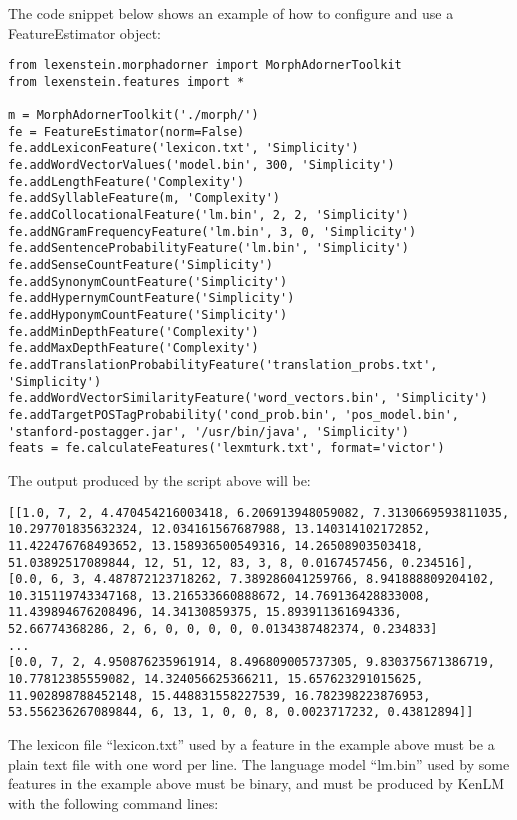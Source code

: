 The code snippet below shows an example of how to configure and use a FeatureEstimator object:

\begin{lstlisting}
from lexenstein.morphadorner import MorphAdornerToolkit
from lexenstein.features import *

m = MorphAdornerToolkit('./morph/')
fe = FeatureEstimator(norm=False)
fe.addLexiconFeature('lexicon.txt', 'Simplicity')
fe.addWordVectorValues('model.bin', 300, 'Simplicity')
fe.addLengthFeature('Complexity')
fe.addSyllableFeature(m, 'Complexity')
fe.addCollocationalFeature('lm.bin', 2, 2, 'Simplicity')
fe.addNGramFrequencyFeature('lm.bin', 3, 0, 'Simplicity')
fe.addSentenceProbabilityFeature('lm.bin', 'Simplicity')
fe.addSenseCountFeature('Simplicity')
fe.addSynonymCountFeature('Simplicity')
fe.addHypernymCountFeature('Simplicity')
fe.addHyponymCountFeature('Simplicity')
fe.addMinDepthFeature('Complexity')
fe.addMaxDepthFeature('Complexity')
fe.addTranslationProbabilityFeature('translation_probs.txt', 'Simplicity')
fe.addWordVectorSimilarityFeature('word_vectors.bin', 'Simplicity')
fe.addTargetPOSTagProbability('cond_prob.bin', 'pos_model.bin', 'stanford-postagger.jar', '/usr/bin/java', 'Simplicity')
feats = fe.calculateFeatures('lexmturk.txt', format='victor')
\end{lstlisting}

The output produced by the script above will be:

\begin{lstlisting}
[[1.0, 7, 2, 4.470454216003418, 6.206913948059082, 7.3130669593811035, 10.297701835632324, 12.034161567687988, 13.140314102172852, 11.422476768493652, 13.158936500549316, 14.26508903503418, 51.03892517089844, 12, 51, 12, 83, 3, 8, 0.0167457456, 0.234516], [0.0, 6, 3, 4.487872123718262, 7.389286041259766, 8.941888809204102, 10.315119743347168, 13.216533660888672, 14.769136428833008, 11.439894676208496, 14.34130859375, 15.893911361694336, 52.66774368286, 2, 6, 0, 0, 0, 0, 0.0134387482374, 0.234833]
...
[0.0, 7, 2, 4.950876235961914, 8.496809005737305, 9.830375671386719, 10.77812385559082, 14.324056625366211, 15.657623291015625, 11.902898788452148, 15.448831558227539, 16.782398223876953, 53.556236267089844, 6, 13, 1, 0, 0, 8, 0.0023717232, 0.43812894]]
\end{lstlisting}

The lexicon file ``lexicon.txt'' used by a feature in the example above must be a plain text file with one word per line. The language model ``lm.bin'' used by some features in the example above must be binary, and must be produced by KenLM with the following command lines:

